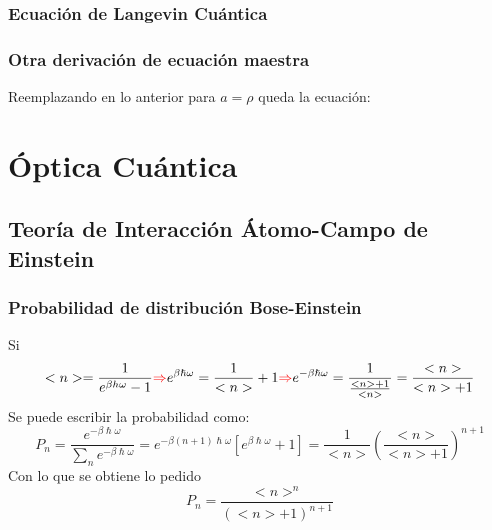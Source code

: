 \documentclass{book}
\begin{document}
\subsection{Ecuación de Langevin Cuántica}
\subsection{Otra derivación de ecuación maestra}
Reemplazando en lo anterior para $a=\rho$ queda la ecuación:
\begin{equation}\end{equation}

\chapter{Óptica Cuántica}
\section{Teoría de Interacción Átomo-Campo de Einstein}
\subsection{Probabilidad de distribución Bose-Einstein}
Si \begin{equation}{ <n>=\frac{1}{e^{\beta h\omega}-1}\textcolor{red}{\Rightarrow} e^{\beta\hslash\omega}=\frac{1}{<n>}+1 \textcolor{red}{\Rightarrow} e^{-\beta\hslash\omega}=\frac{1}{\frac{<n>+1}{<n>}}=\frac{<n>}{<n>+1}}\end{equation}
Se puede escribir la probabilidad como:
\begin{equation}{ P_n=\frac{e^{-\beta\hslash\omega}}{\sum_n e^{-\beta\hslash\omega}}=e^{-\beta(n+1)\hslash\omega}[e^{\beta\hslash\omega}+1]=\frac{1}{<n>}(\frac{<n>}{<n>+1})^{n+1}}\end{equation}
Con lo que se obtiene lo pedido
\begin{equation}{ P_n=\frac{<n>^n}{(<n>+1)^{n+1}}}\end{equation}
\end{document}

